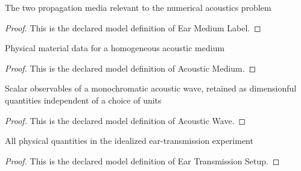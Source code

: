 \begin{definition}
  \label{def:physics:phyx-mini-0189:phyxminiproblems-problemphyxmini0189-earmediumlabel}
  The two propagation media relevant to the numerical acoustics problem
\end{definition}
\begin{proof}
  This is the declared model definition of Ear Medium Label.
\end{proof}
\begin{definition}
  \label{def:physics:phyx-mini-0189:phyxminiproblems-problemphyxmini0189-acousticmedium}
  Physical material data for a homogeneous acoustic medium
\end{definition}
\begin{proof}
  This is the declared model definition of Acoustic Medium.
\end{proof}
\begin{definition}
  \label{def:physics:phyx-mini-0189:phyxminiproblems-problemphyxmini0189-acousticwave}
  Scalar observables of a monochromatic acoustic wave, retained as dimensionful quantities independent of a choice of units
\end{definition}
\begin{proof}
  This is the declared model definition of Acoustic Wave.
\end{proof}
\begin{definition}
  \label{def:physics:phyx-mini-0189:phyxminiproblems-problemphyxmini0189-eartransmissionsetup}
  All physical quantities in the idealized ear-transmission experiment
\end{definition}
\begin{proof}
  This is the declared model definition of Ear Transmission Setup.
\end{proof}
